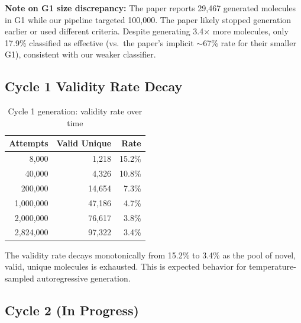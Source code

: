\documentclass[11pt]{article}
\begin{document}
\noindent\textbf{Note on G1 size discrepancy:} The paper reports 29,467 generated molecules in G1 while our pipeline targeted 100,000. The paper likely stopped generation earlier or used different criteria. Despite generating 3.4$\times$ more molecules, only 17.9\% classified as effective (vs.\ the paper's implicit $\sim$67\% rate for their smaller G1), consistent with our weaker classifier.

\subsection{Cycle 1 Validity Rate Decay}

\begin{table}[H]
\centering
\caption{Cycle 1 generation: validity rate over time}
\label{tab:c1_decay}
\small
\begin{tabular}{@{}rrr@{}}
\toprule
\textbf{Attempts} & \textbf{Valid Unique} & \textbf{Rate} \\
\midrule
8,000 & 1,218 & 15.2\% \\
40,000 & 4,326 & 10.8\% \\
200,000 & 14,654 & 7.3\% \\
1,000,000 & 47,186 & 4.7\% \\
2,000,000 & 76,617 & 3.8\% \\
2,824,000 & 97,322 & 3.4\% \\
\bottomrule
\end{tabular}
\end{table}

\noindent The validity rate decays monotonically from 15.2\% to 3.4\% as the pool of novel, valid, unique molecules is exhausted. This is expected behavior for temperature-sampled autoregressive generation.

\subsection{Cycle 2 (In Progress)}
\end{document}
